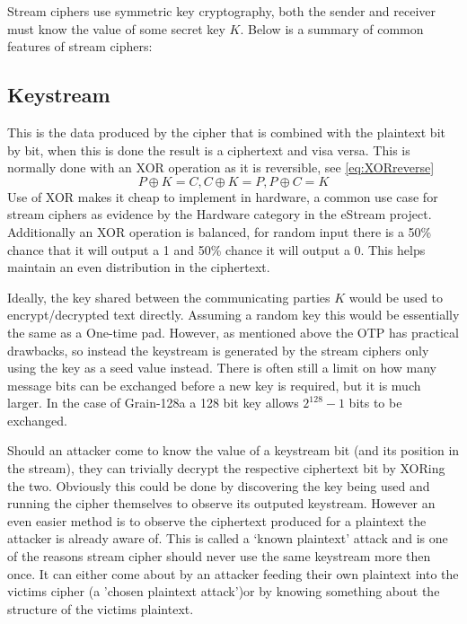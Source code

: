 \documentclass{report}
\let\Oldsubsection\subsection
\renewcommand{\subsection}{\FloatBarrier\Oldsubsection}
\begin{document}
Stream ciphers use symmetric key cryptography, both the sender and receiver must know the value of some secret key $K$.
\newpage
Below is a summary of common features of stream ciphers:
\subsection{Keystream}
This is the data produced by the cipher that is combined with the plaintext bit by bit, when this is done the result is a ciphertext and visa versa. This is normally done with an XOR operation as it is reversible, see \ref{eq:XORreverse}
\begin{equation}
P \oplus K=C, C \oplus K=P, P \oplus C = K
\label{eq:XORreverse}
\end{equation}
Use of XOR makes it cheap to implement in hardware, a common use case for stream ciphers as evidence by the Hardware category in the eStream project\cite{eStreamPort}. Additionally an XOR operation is balanced, for random input there is a 50\% chance that it will output a 1 and 50\% chance it will output a 0. This helps maintain an even distribution in the ciphertext.

Ideally, the key shared between the communicating parties $K$ would be used to encrypt/decrypted text directly. Assuming a random key this would be essentially the same as a One-time pad. However, as mentioned above the OTP has practical drawbacks, so instead the keystream is generated by the stream ciphers only using the key as a seed value instead. There is often still a limit on how many message bits can be exchanged before a new key is required, but it is much larger. In the case of Grain-128a a 128 bit key allows $2^128-1$ bits to be exchanged\cite{Grain128aSpec}.

Should an attacker come to know the value of a keystream bit (and its position in the stream), they can trivially decrypt the respective ciphertext bit by XORing the two. Obviously this could be done by discovering the key being used and running the cipher themselves to observe its outputed keystream. However an even easier method is to observe the ciphertext produced for a plaintext the attacker is already aware of. This is called a `known plaintext' attack\cite{plaintextAttack} and is one of the reasons stream cipher should never use the same keystream more then once. It can either come about by an attacker feeding their own plaintext into the victims cipher (a 'chosen plaintext attack')or by knowing something about the structure of the victims plaintext.
\end{document}
